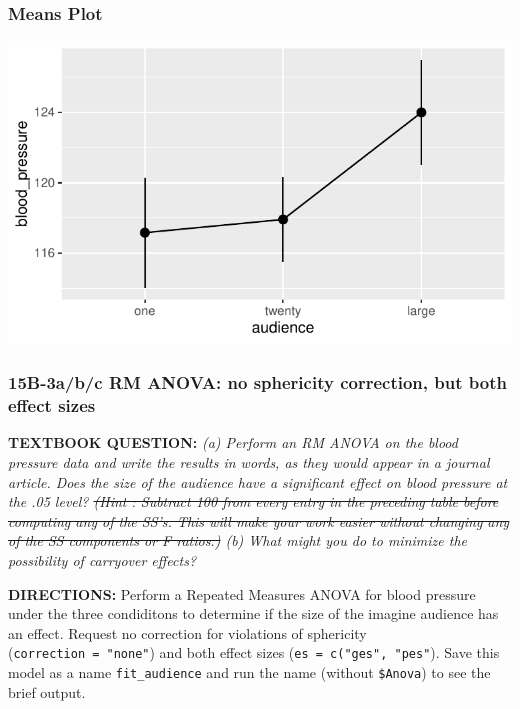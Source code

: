 \documentclass[
]{article}
\begin{document}
\hypertarget{means-plot}{%
\subsubsection{Means Plot}\label{means-plot}}

\begin{center}\includegraphics{Chapter-15-Assignment-R-Skeleton--2020spring_files/figure-latex/unnamed-chunk-12-1} \end{center}

\clearpage

\hypertarget{b-3abc-rm-anova-no-sphericity-correction-but-both-effect-sizes}{%
\subsubsection{15B-3a/b/c RM ANOVA: no sphericity correction, but both
effect
sizes}\label{b-3abc-rm-anova-no-sphericity-correction-but-both-effect-sizes}}

\textbf{TEXTBOOK QUESTION:} \emph{(a) Perform an RM ANOVA on the blood
pressure data and write the results in words, as they would appear in a
journal article. Does the size of the audience have a significant effect
on blood pressure at the .05 level? \sout{(Hint : Subtract 100 from
every entry in the preceding table before computing any of the SS's.
This will make your work easier without changing any of the SS
components or F ratios.)} (b) What might you do to minimize the
possibility of carryover effects?}

\textbf{DIRECTIONS:} Perform a Repeated Measures ANOVA for blood
pressure under the three condiditons to determine if the size of the
imagine audience has an effect. Request no correction for violations of
sphericity (\texttt{correction\ =\ "none"}) and both effect sizes
(\texttt{es\ =\ c("ges",\ "pes"}). Save this model as a name
\texttt{fit\_audience} and run the name (without \texttt{\$Anova}) to
see the brief output.
\end{document}
